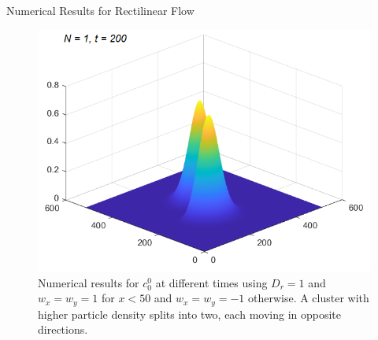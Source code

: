 \begin{frame}{Numerical Results for Rectilinear Flow}
\begin{figure}[H]
\begin{minipage}{0.4\textwidth}
				\includegraphics[scale=0.23]{Bilder_wxwy/t=200_wxwy=1_wxwy=-1}
			\end{minipage}
			\caption{Numerical results for $c^0_0$ at different times using $D_r=1$ and $w_x=w_y=1$ for $x<50$ and $w_x=w_y=-1$ otherwise. A cluster with higher particle density splits into two, each moving in opposite directions.}
		\end{figure}
\end{frame}
